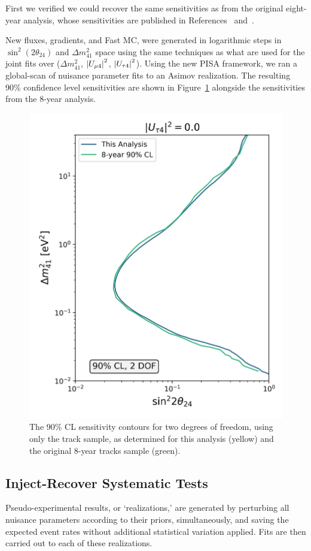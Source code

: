 \documentclass[main.tex]{subfiles}
\begin{document}
First we verified we could recover the same sensitivities as from the original eight-year analysis, whose sensitivities are published in References~\cite{Aartsen_2020} and~\cite{Aartsen_2020_prd}.

New fluxes, gradients, and Fast MC, were generated in logarithmic steps in $\sin^{2}(2\theta_{24})$ and $\Delta m_{41}^{2}$ space using the same techniques as what are used for the joint fits over ($\Delta m_{41}^{2}$, $\left| U_{\mu 4} \right|^{2}$, $\left| U_{\tau 4} \right|^{2}$).
Using the new PISA framework, we ran a global-scan of nuisance parameter fits to an Asimov realization.
The resulting 90\% confidence level sensitivities are shown in Figure~\ref{fig:comparison} alongside the sensitivities from the 8-year analysis. 

\begin{figure}
    \centering
    \includegraphics[width=0.6\linewidth]{figures/track_asimov_oldairs_Realization_Asimov_sterile_0_cl0.9_dof2.png}
    \caption{The 90\% CL sensitivity contours for two degrees of freedom, using only the track sample, as determined for this analysis (yellow) and the original 8-year tracks sample (green).}\label{fig:comparison}
\end{figure}

\subsection{Inject-Recover Systematic Tests}

Pseudo-experimental results, or `realizations,' are generated by perturbing all nuisance parameters according to their priors, simultaneously, and saving the expected event rates without additional statistical variation applied. 
Fits are then carried out to each of these realizations.
\end{document}

